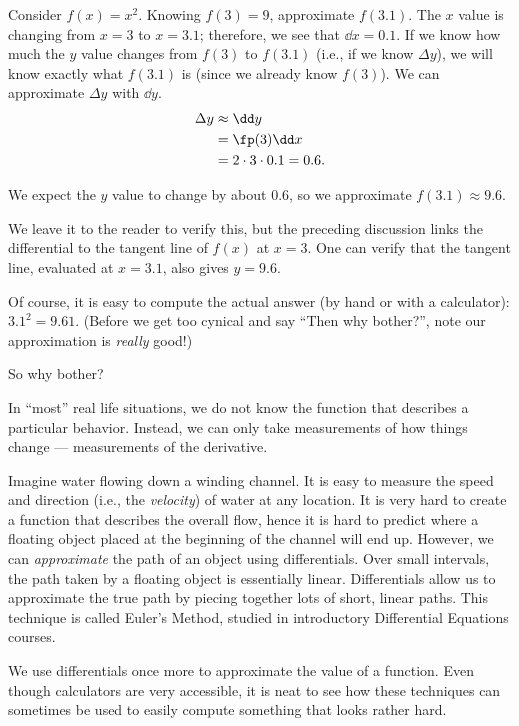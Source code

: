 \begin{example}\label{ex_diffal1}
Consider $f(x) = x^2$. Knowing $f(3) = 9$, approximate $f(3.1)$.
\solution
The $x$ value is changing from $x=3$ to $x=3.1$; therefore, we see that $\dd x=0.1$. If we know how much the $y$ value changes from $f(3)$ to $f(3.1)$ (i.e., if we know $\Delta y$), we will know exactly what $f(3.1)$ is (since we already know $f(3)$). We can approximate $\Delta y$ with $\dd y$.
\begin{align*}
	\Delta y &\approx \dd y \\
	&= \fp(3)\dd x \\
	&= 2\cdot 3\cdot 0.1 = 0.6.
\end{align*}

We expect the $y$ value to change by about $0.6$, so we approximate $f(3.1) \approx 9.6.$

We leave it to the reader to verify this, but the preceding discussion links the differential to the tangent line of $f(x)$ at $x=3$. One can verify that the tangent line, evaluated at $x=3.1$, also gives $y=9.6$.
\end{example}

Of course, it is easy to compute the actual answer (by hand or with a calculator): $3.1^2 = 9.61.$ (Before we get too cynical and say ``Then why bother?'', note our approximation is \emph{really} good!)

So why bother?

In ``most'' real life situations, we do not know the function that describes a particular behavior. Instead, we can only take measurements of how things change --- measurements of the derivative.

Imagine water flowing down a winding channel. It is easy to measure the speed and direction (i.e., the \emph{velocity}) of water at any location. It is very hard to create a function that describes the overall flow, hence it is hard to predict where a floating object placed at the beginning of the channel will end up. However, we can \emph{approximate} the path of an object using differentials. Over small intervals, the path taken by a floating object is essentially linear. Differentials allow us to approximate the true path by piecing together lots of short, linear paths. This technique is called Euler's Method, studied in introductory Differential Equations courses.

We use differentials once more to approximate the value of a function. Even though calculators are very accessible, it is neat to see how these techniques can sometimes be used to easily compute something that looks rather hard.

